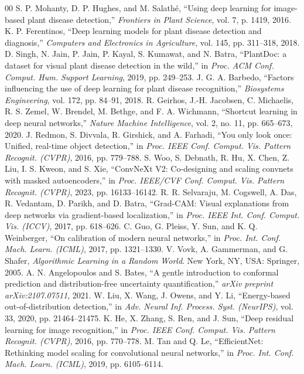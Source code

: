 \documentclass[conference]{IEEEtran}
\begin{document}

\begin{thebibliography}{00}
 S. P. Mohanty, D. P. Hughes, and M. Salath{\'e}, ``Using deep learning for image-based plant disease detection,'' \emph{Frontiers in Plant Science}, vol. 7, p. 1419, 2016.
 K. P. Ferentinos, ``Deep learning models for plant disease detection and diagnosis,'' \emph{Computers and Electronics in Agriculture}, vol. 145, pp. 311--318, 2018.
 D. Singh, N. Jain, P. Jain, P. Kayal, S. Kumawat, and N. Batra, ``PlantDoc: a dataset for visual plant disease detection in the wild,'' in \emph{Proc. ACM Conf. Comput. Hum. Support Learning}, 2019, pp. 249--253.
 J. G. A. Barbedo, ``Factors influencing the use of deep learning for plant disease recognition,'' \emph{Biosystems Engineering}, vol. 172, pp. 84--91, 2018.
 R. Geirhos, J.-H. Jacobsen, C. Michaelis, R. S. Zemel, W. Brendel, M. Bethge, and F. A. Wichmann, ``Shortcut learning in deep neural networks,'' \emph{Nature Machine Intelligence}, vol. 2, no. 11, pp. 665--673, 2020.
 J. Redmon, S. Divvala, R. Girshick, and A. Farhadi, ``You only look once: Unified, real-time object detection,'' in \emph{Proc. IEEE Conf. Comput. Vis. Pattern Recognit. (CVPR)}, 2016, pp. 779--788.
 S. Woo, S. Debnath, R. Hu, X. Chen, Z. Liu, I. S. Kweon, and S. Xie, ``ConvNeXt V2: Co-designing and scaling convnets with masked autoencoders,'' in \emph{Proc. IEEE/CVF Conf. Comput. Vis. Pattern Recognit. (CVPR)}, 2023, pp. 16133--16142.
 R. R. Selvaraju, M. Cogswell, A. Das, R. Vedantam, D. Parikh, and D. Batra, ``Grad-CAM: Visual explanations from deep networks via gradient-based localization,'' in \emph{Proc. IEEE Int. Conf. Comput. Vis. (ICCV)}, 2017, pp. 618--626.
 C. Guo, G. Pleiss, Y. Sun, and K. Q. Weinberger, ``On calibration of modern neural networks,'' in \emph{Proc. Int. Conf. Mach. Learn. (ICML)}, 2017, pp. 1321--1330.
 V. Vovk, A. Gammerman, and G. Shafer, \emph{Algorithmic Learning in a Random World}. New York, NY, USA: Springer, 2005.
 A. N. Angelopoulos and S. Bates, ``A gentle introduction to conformal prediction and distribution-free uncertainty quantification,'' \emph{arXiv preprint arXiv:2107.07511}, 2021.
 W. Liu, X. Wang, J. Owens, and Y. Li, ``Energy-based out-of-distribution detection,'' in \emph{Adv. Neural Inf. Process. Syst. (NeurIPS)}, vol. 33, 2020, pp. 21464--21475.
 K. He, X. Zhang, S. Ren, and J. Sun, ``Deep residual learning for image recognition,'' in \emph{Proc. IEEE Conf. Comput. Vis. Pattern Recognit. (CVPR)}, 2016, pp. 770--778.
 M. Tan and Q. Le, ``EfficientNet: Rethinking model scaling for convolutional neural networks,'' in \emph{Proc. Int. Conf. Mach. Learn. (ICML)}, 2019, pp. 6105--6114.
\end{thebibliography}
\end{document}
